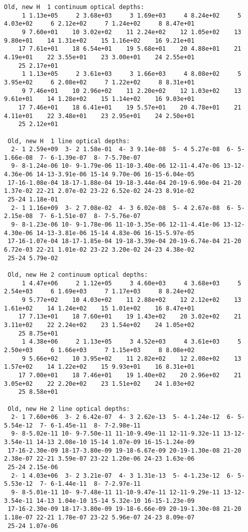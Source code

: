 {\setverbatimfontsize{\tiny}
\begin{verbatim}
Old, new H  1 continuum optical depths:
     1 1.13e+05     2 3.68e+03     3 1.69e+03     4 8.24e+02     5 4.03e+02     6 2.12e+02     7 1.24e+02     8 8.47e+01
     9 7.60e+01    10 3.02e+02    11 2.24e+02    12 1.05e+02    13 9.80e+01    14 1.31e+02    15 1.16e+02    16 9.21e+01
    17 7.61e+01    18 6.54e+01    19 5.68e+01    20 4.88e+01    21 4.19e+01    22 3.55e+01    23 3.00e+01    24 2.55e+01
    25 2.17e+01
     1 1.13e+05     2 3.61e+03     3 1.66e+03     4 8.08e+02     5 3.95e+02     6 2.08e+02     7 1.22e+02     8 8.31e+01
     9 7.46e+01    10 2.96e+02    11 2.20e+02    12 1.03e+02    13 9.61e+01    14 1.28e+02    15 1.14e+02    16 9.03e+01
    17 7.46e+01    18 6.41e+01    19 5.57e+01    20 4.78e+01    21 4.11e+01    22 3.48e+01    23 2.95e+01    24 2.50e+01
    25 2.12e+01

 Old, new H  1 line optical depths:
  2- 1 2.59e+09  3- 2 1.58e-01  4- 3 9.14e-08  5- 4 5.27e-08  6- 5-1.66e-08  7- 6-1.39e-07  8- 7-5.70e-07
  9- 8-1.24e-06 10- 9-1.79e-06 11-10-3.40e-06 12-11-4.47e-06 13-12-4.36e-06 14-13-3.91e-06 15-14 9.70e-06 16-15-6.04e-05
 17-16-1.08e-04 18-17-1.88e-04 19-18-3.44e-04 20-19-6.90e-04 21-20 1.37e-02 22-21 2.07e-02 23-22 6.52e-02 24-23 8.91e-02
 25-24 1.18e-01
  2- 1 1.16e+09  3- 2 7.08e-02  4- 3 6.02e-08  5- 4 2.67e-08  6- 5-2.15e-08  7- 6-1.51e-07  8- 7-5.76e-07
  9- 8-1.23e-06 10- 9-1.78e-06 11-10-3.35e-06 12-11-4.41e-06 13-12-4.30e-06 14-13-3.81e-06 15-14 4.83e-06 16-15-5.97e-05
 17-16-1.07e-04 18-17-1.85e-04 19-18-3.39e-04 20-19-6.74e-04 21-20 6.72e-03 22-21 1.01e-02 23-22 3.20e-02 24-23 4.38e-02
 25-24 5.79e-02

 Old, new He 2 continuum optical depths:
     1 4.47e+06     2 1.12e+05     3 4.60e+03     4 3.68e+03     5 2.54e+03     6 1.69e+03     7 1.17e+03     8 8.24e+02
     9 5.77e+02    10 4.03e+02    11 2.88e+02    12 2.12e+02    13 1.61e+02    14 1.24e+02    15 1.01e+02    16 8.47e+01
    17 7.13e+01    18 7.60e+01    19 1.43e+02    20 3.02e+02    21 3.11e+02    22 2.24e+02    23 1.54e+02    24 1.05e+02
    25 8.75e+01
     1 4.38e+06     2 1.13e+05     3 4.52e+03     4 3.61e+03     5 2.50e+03     6 1.66e+03     7 1.15e+03     8 8.08e+02
     9 5.66e+02    10 3.95e+02    11 2.82e+02    12 2.08e+02    13 1.57e+02    14 1.22e+02    15 9.93e+01    16 8.31e+01
    17 7.00e+01    18 7.46e+01    19 1.40e+02    20 2.96e+02    21 3.05e+02    22 2.20e+02    23 1.51e+02    24 1.03e+02
    25 8.58e+01

 Old, new He 2 line optical depths:
  2- 1 7.60e+06  3- 2 6.42e-07  4- 3 2.62e-13  5- 4-1.24e-12  6- 5-5.54e-12  7- 6-1.45e-11  8- 7-2.98e-11
  9- 8-5.02e-11 10- 9-7.50e-11 11-10-9.49e-11 12-11-9.32e-11 13-12-3.54e-11 14-13 2.08e-10 15-14 1.07e-09 16-15-1.24e-09
 17-16-2.30e-09 18-17-3.80e-09 19-18-6.67e-09 20-19-1.30e-08 21-20 2.38e-07 22-21 3.59e-07 23-22 1.20e-06 24-23 1.63e-06
 25-24 2.15e-06
  2- 1 4.03e+06  3- 2 3.21e-07  4- 3 1.31e-13  5- 4-1.23e-12  6- 5-5.53e-12  7- 6-1.44e-11  8- 7-2.97e-11
  9- 8-5.01e-11 10- 9-7.48e-11 11-10-9.47e-11 12-11-9.29e-11 13-12-3.54e-11 14-13 1.04e-10 15-14 5.32e-10 16-15-1.23e-09
 17-16-2.30e-09 18-17-3.80e-09 19-18-6.66e-09 20-19-1.30e-08 21-20 1.18e-07 22-21 1.78e-07 23-22 5.96e-07 24-23 8.09e-07
 25-24 1.07e-06


\end{verbatim}}
